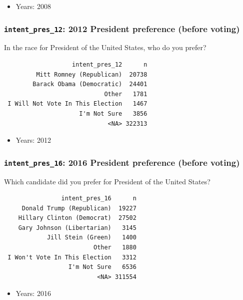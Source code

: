 \documentclass[10pt,article,oneside]{memoir}
\theoremstyle{definition}
\begin{document}
\begin{itemize}
\tightlist
\item
  Years: 2008
\end{itemize}

\subsubsection{\texorpdfstring{\texttt{intent\_pres\_12}: 2012 President
preference (before
voting)}{intent\_pres\_12: 2012 President preference (before voting)}}\label{intent_pres_12-2012-president-preference-before-voting}

In the race for President of the United States, who do you prefer?

\begin{verbatim}
                   intent_pres_12      n
         Mitt Romney (Republican)  20738
        Barack Obama (Democratic)  24401
                            Other   1781
 I Will Not Vote In This Election   1467
                     I'm Not Sure   3856
                             <NA> 322313
\end{verbatim}

\begin{itemize}
\tightlist
\item
  Years: 2012
\end{itemize}

\subsubsection{\texorpdfstring{\texttt{intent\_pres\_16}: 2016 President
preference (before
voting)}{intent\_pres\_16: 2016 President preference (before voting)}}\label{intent_pres_16-2016-president-preference-before-voting}

Which candidate did you prefer for President of the United States?

\begin{verbatim}
                intent_pres_16      n
     Donald Trump (Republican)  19227
    Hillary Clinton (Democrat)  27502
    Gary Johnson (Libertarian)   3145
            Jill Stein (Green)   1400
                         Other   1880
 I Won't Vote In This Election   3312
                  I'm Not Sure   6536
                          <NA> 311554
\end{verbatim}

\begin{itemize}
\tightlist
\item
  Years: 2016
\end{itemize}
\end{document}
